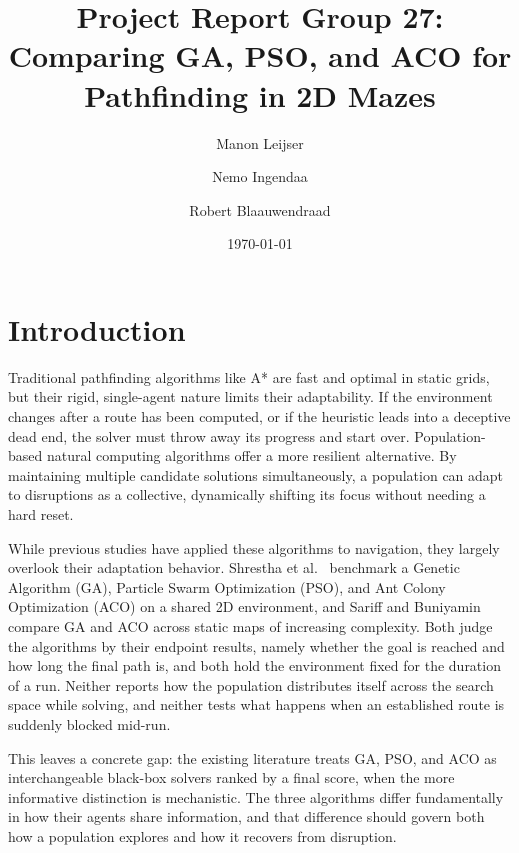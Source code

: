 \documentclass[11pt,a4paper]{article}
\title{Project Report Group 27: Comparing GA, PSO, and ACO for\\
Pathfinding in 2D Mazes}
\author{\large Manon Leijser \and Nemo Ingendaa \and Robert Blaauwendraad}
\date{\today}
\begin{document}
    \maketitle

    \section{Introduction}
    Traditional pathfinding algorithms like A* are fast and optimal in static grids, but their rigid, single-agent nature limits their adaptability. If the environment changes after a route has been computed, or if the heuristic leads into a deceptive dead end, the solver must throw away its progress and start over. Population-based natural computing algorithms offer a more resilient alternative. By maintaining multiple candidate solutions simultaneously, a population can adapt to disruptions as a collective, dynamically shifting its focus without needing a hard reset.

    While previous studies have applied these algorithms to navigation, they largely overlook their adaptation behavior. Shrestha et al.~\cite{shrestha2024} benchmark a Genetic Algorithm (GA), Particle Swarm Optimization (PSO), and Ant Colony Optimization (ACO) on a shared 2D environment, and Sariff and Buniyamin~\cite{sariff2009} compare GA and ACO across static maps of increasing complexity. Both judge the algorithms by their endpoint results, namely whether the goal is reached and how long the final path is, and both hold the environment fixed for the duration of a run. Neither reports how the population distributes itself across the search space while solving, and neither tests what happens when an established route is suddenly blocked mid-run.

    This leaves a concrete gap: the existing literature treats GA, PSO, and ACO as interchangeable black-box solvers ranked by a final score, when the more informative distinction is mechanistic. The three algorithms differ fundamentally in how their agents share information, and that difference should govern both how a population explores and how it recovers from disruption.
\end{document}
